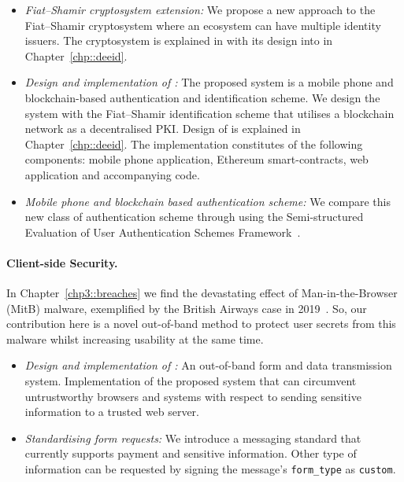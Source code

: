 \begin{itemize}
\item \textit{Fiat--Shamir cryptosystem extension:} We propose a new approach to the Fiat--Shamir cryptosystem where an ecosystem can have multiple identity issuers. The cryptosystem is explained in with its design into \deeid in Chapter~\ref{chp::deeid}.
  
\item \textit{Design and implementation of \deeid:} The proposed system is a mobile phone and blockchain-based authentication and identification scheme. We design the system with the Fiat--Shamir identification scheme that utilises a blockchain network as a decentralised PKI. Design of \deeid is explained in Chapter~\ref{chp::deeid}. The implementation constitutes of the following components: mobile phone application, Ethereum smart-contracts, web application and accompanying code. 

\item \textit{Mobile phone and blockchain based authentication scheme:} We compare this new class of authentication scheme through \deeid using the Semi-structured Evaluation of User Authentication Schemes Framework~\cite{bonneau_quest_2012}.

\end{itemize}

\paragraph{Client-side Security.} In Chapter~\ref{chp3::breaches} we find the devastating effect of Man-in-the-Browser (MitB) malware, exemplified by the British Airways case in 2019~\cite{klijnsma_british_2018}. So, our contribution here is a novel out-of-band method to protect user secrets from this malware whilst increasing usability at the same time.

\begin{itemize}
\item \textit{Design and implementation of \formless:} An out-of-band form and data transmission system. Implementation of the proposed system that can circumvent untrustworthy browsers and systems with respect to sending sensitive information to a trusted web server.

\item \textit{Standardising form requests:} We introduce a messaging standard that currently supports payment and sensitive information. Other type of information can be requested by signing the message's \texttt{form\_type} as \texttt{custom}.
\end{itemize}

